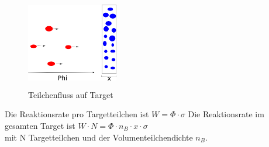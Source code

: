 \documentclass[Ex4_Zusammenfassung.tex]{subfiles}
\begin{document}
\begin{figure}[h]
\centering
\includegraphics[height= 4cm, width=4cm]{fluss.png}
\caption{Teilchenfluss auf Target}
\end{figure}
Die Reaktionsrate pro Targetteilchen ist $ W = \Phi \cdot \sigma $ 
Die Reaktionsrate im gesamten Target ist $ W \cdot N = \Phi \cdot n_{B} \cdot x \cdot \sigma $ \\ 
mit N Targetteilchen und der Volumenteilchendichte $ n_B $. \newline
\end{document}
